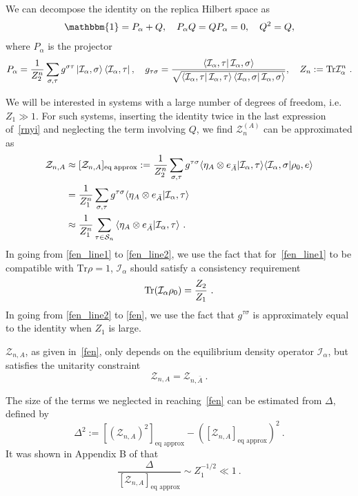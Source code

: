 \documentclass[a4paper,11pt]{article}
\newcommand\vev[1]{{\ensuremath{\left\langle{#1}\right\rangle}}}
\newcommand{\be}{\begin{equation}}
\newcommand{\ee}{\end{equation}}
\newcommand\al{{\alpha}}
\newcommand\sig{\sigma}
\newcommand\ov{\over}
\newcommand\sI{{\ensuremath{{\mathcal I}}}}
\newcommand\sS{{\mathcal S}}
\newcommand\sZ{{\mathcal Z}}
\newcommand{\Tr}{\text{Tr}}
\begin{document}
We can decompose the identity on the replica Hilbert space as
\begin{align} \label{idf}
 \mathbbm{1} = P_{\alpha} + Q, \quad P_{\alpha }Q = QP_{\alpha } = 0,\quad Q^2 = Q,
\end{align}
where $P_\al$ is the projector
\begin{align}
 P_{\alpha} = \frac{1}{Z_2^n}\sum_{\sigma,\tau} g^{\sigma \tau}\ket{\mathcal{I}_{\alpha}, \sigma}\bra{\mathcal{I}_{\alpha},\tau}, \quad
 g_{\tau \sigma} = \frac{\bra{\mathcal{I}_{\alpha},\tau}\mathcal{I}_{\alpha},\sigma\rangle}{\sqrt{\bra{\mathcal{I}_{\alpha},\tau}\mathcal{I}_{\alpha},\tau\rangle\bra{\mathcal{I}_{\alpha},\sigma}\mathcal{I}_{\alpha},\sigma\rangle}}, \quad Z_n := {\rm Tr} \sI_\al^n \ . \label{palpha}
\end{align}

We will be interested in systems with a large number of degrees of freedom, i.e.~$Z_1 \gg 1$. 
For such systems, inserting the identity twice in the last expression of~\eqref{rnyi} and neglecting the term involving $Q$, 
we find $\sZ_{n}^{(A)}$ can be approximated as 
\begin{align} 
\sZ_{n, A} & \approx [\sZ_{n, A}]_{\rm eq \; approx} := {1 \ov Z_2^n} \sum_{\sig, \tau} g^{\tau\sig} \vev{\eta_A \otimes e_{\bar A} | \sI_\al , \tau} \vev{\sI_\al, \sig|\rho_0,e} \label{fen_line1} \\
& = {1 \ov Z_1^n} \sum_{\sig, \tau} g^{\tau\sig} \vev{\eta_A \otimes e_{\bar A} | \sI_\al , \tau} \label{fen_line2}\\
& \approx {1 \ov Z_1^n} \sum_{\tau \in \sS_n} \vev{\eta_A \otimes e_{\bar A} | \sI_\al , \tau} \ . \label{fen}
\end{align} 
In going from \eqref{fen_line1} to \eqref{fen_line2}, we use the fact that for~\eqref{fen_line1} to be compatible with $\Tr \rho= 1$, $\sI_\al$ should satisfy 
a consistency requirement
\be \label{conw}
\Tr (\sI_ \al \rho_0 )= {Z_2 \ov Z_1} \ .
\ee
In going from \eqref{fen_line2} to \eqref{fen}, we use the fact that $g^{\tau \sigma}$ is approximately equal to the identity when $Z_1$ is large. 
 
 $\sZ_{n, A}$, as given in~\eqref{fen}, only depends on the equilibrium density operator $\sI_\al$, but satisfies the unitarity constraint 
\be \label{unit1}
 \sZ_{n, A} = \sZ_{n, \bar A} \ .
\ee


 The size of the terms we neglected in reaching~\eqref{fen} 
can be estimated from $\Delta$, defined by 
\be 
\label{Renyi_q} 
\Delta^2 := [(\sZ_{n,A})^2]_{\text{eq approx}}- \left([\sZ_{n, A}]_{\text{eq approx}}\right)^2 \ .
\ee
It was shown in Appendix B of \cite{2020arXiv200801089L} that
\be 
\frac{\Delta}{[\sZ_{n, A}]_{\text{eq approx}}} \sim Z_1^{-1/2} \ll 1\ .
\label{delta}
\ee
 
\end{document}
